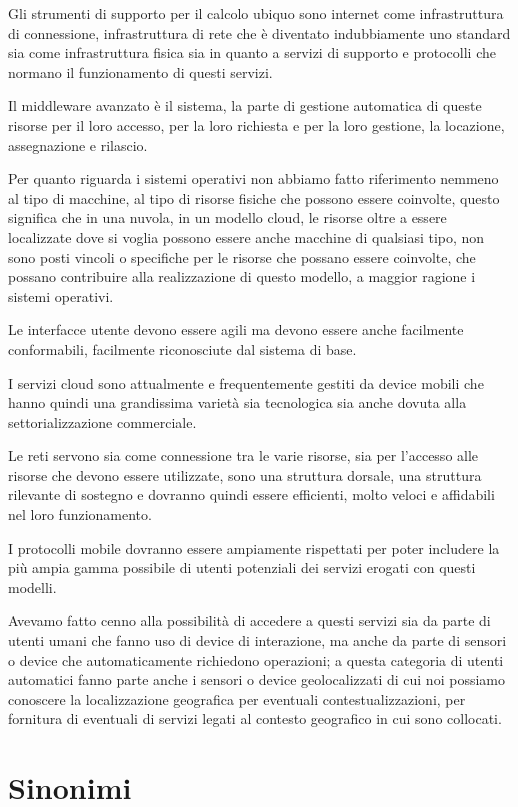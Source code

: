 Gli strumenti di supporto per il calcolo ubiquo sono internet come infrastruttura di connessione, infrastruttura di rete che è diventato indubbiamente uno standard sia come infrastruttura fisica sia in quanto a servizi di supporto e protocolli che normano il funzionamento di questi servizi.

Il middleware avanzato è il sistema, la parte di gestione automatica di queste risorse per il loro accesso, per la loro richiesta e per la loro gestione, la locazione, assegnazione e rilascio.

Per quanto riguarda i sistemi operativi non abbiamo fatto riferimento nemmeno al tipo di macchine, al tipo di risorse fisiche che possono essere coinvolte, questo significa che in una nuvola, in un modello cloud, le risorse oltre a essere localizzate dove si voglia possono essere anche macchine di qualsiasi tipo, non sono posti vincoli o specifiche per le risorse che possano essere coinvolte, che possano contribuire alla realizzazione di questo modello, a maggior ragione i sistemi operativi.

Le interfacce utente devono essere agili ma devono essere anche facilmente conformabili, facilmente riconosciute dal sistema di base.

I servizi cloud sono attualmente e frequentemente gestiti da device mobili che hanno quindi una grandissima varietà sia tecnologica sia anche dovuta alla settorializzazione commerciale.

Le reti servono sia come connessione tra le varie risorse, sia per l'accesso alle risorse che devono essere utilizzate, sono una struttura dorsale, una struttura rilevante di sostegno e dovranno quindi essere efficienti, molto veloci e affidabili nel loro funzionamento.

I protocolli mobile dovranno essere ampiamente rispettati per poter includere la più ampia gamma possibile di utenti potenziali dei servizi erogati con questi modelli.

Avevamo fatto cenno alla possibilità di accedere a questi servizi sia da parte di utenti umani che fanno uso di device di interazione, ma anche da parte di sensori o device che automaticamente richiedono operazioni; a questa categoria di utenti automatici fanno parte anche i sensori o device geolocalizzati di cui noi possiamo conoscere la localizzazione geografica per eventuali contestualizzazioni, per fornitura di eventuali di servizi legati al contesto geografico in cui sono collocati.

\section{Sinonimi} %

